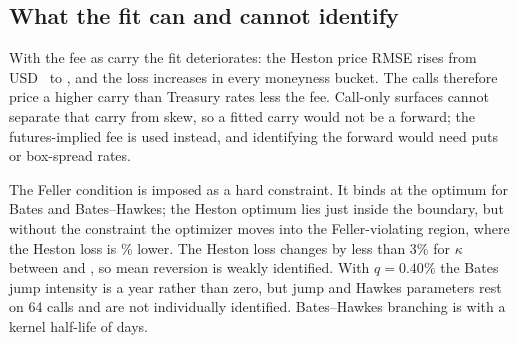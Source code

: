 \subsection{What the fit can and cannot identify}
With the fee as carry the fit deteriorates: the Heston price RMSE rises from USD~\CarryPriceRMSEZero{} to \CarryPriceRMSEFee{}, and the loss increases in every moneyness bucket. The calls therefore price a higher carry than Treasury rates less the fee. Call-only surfaces cannot separate that carry from skew, so a fitted carry would not be a forward; the futures-implied fee is used instead, and identifying the forward would need puts or box-spread rates.

\begin{methodbox}
The Feller condition is imposed as a hard constraint. It binds at the optimum for Bates and Bates--Hawkes; the Heston optimum lies just inside the boundary, but without the constraint the optimizer moves into the Feller-violating region, where the Heston loss is \FellerRelaxedLossRatio\% lower. The Heston loss changes by less than 3\% for $\kappa$ between \KappaFlatLow{} and \KappaFlatHigh, so mean reversion is weakly identified. With $q=0.40\%$ the Bates jump intensity is \BatesLambda{} a year rather than zero, but jump and Hawkes parameters rest on 64 calls and are not individually identified. Bates--Hawkes branching is \HawkesBranching{} with a kernel half-life of \HawkesHalfLifeDays{} days.
\end{methodbox}
